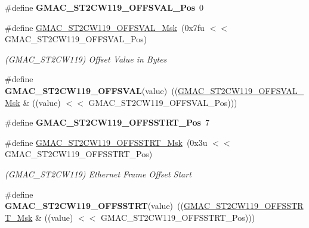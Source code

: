 \begin{DoxyCompactItemize}
\item 
\mbox{\label{group__SAME70__GMAC_ga085476f33b2de0d7a6acc78bb2274812}} 
\#define {\bfseries G\+M\+A\+C\+\_\+\+S\+T2\+C\+W119\+\_\+\+O\+F\+F\+S\+V\+A\+L\+\_\+\+Pos}~0
\item 
\mbox{\label{group__SAME70__GMAC_ga8acadd4c964c7e746cab7ab34153fdb1}} 
\#define \mbox{\hyperlink{group__SAME70__GMAC_ga8acadd4c964c7e746cab7ab34153fdb1}{G\+M\+A\+C\+\_\+\+S\+T2\+C\+W119\+\_\+\+O\+F\+F\+S\+V\+A\+L\+\_\+\+Msk}}~(0x7fu $<$$<$ G\+M\+A\+C\+\_\+\+S\+T2\+C\+W119\+\_\+\+O\+F\+F\+S\+V\+A\+L\+\_\+\+Pos)
\begin{DoxyCompactList}\small\item\em (G\+M\+A\+C\+\_\+\+S\+T2\+C\+W119) Offset Value in Bytes \end{DoxyCompactList}\item 
\mbox{\label{group__SAME70__GMAC_ga996e67c23d2b8f02918fde77c22cc99a}} 
\#define {\bfseries G\+M\+A\+C\+\_\+\+S\+T2\+C\+W119\+\_\+\+O\+F\+F\+S\+V\+AL}(value)~((\mbox{\hyperlink{group__SAMV71__GMAC_ga8acadd4c964c7e746cab7ab34153fdb1}{G\+M\+A\+C\+\_\+\+S\+T2\+C\+W119\+\_\+\+O\+F\+F\+S\+V\+A\+L\+\_\+\+Msk}} \& ((value) $<$$<$ G\+M\+A\+C\+\_\+\+S\+T2\+C\+W119\+\_\+\+O\+F\+F\+S\+V\+A\+L\+\_\+\+Pos)))
\item 
\mbox{\label{group__SAME70__GMAC_ga18ffa26520619e39aa339b9588abae56}} 
\#define {\bfseries G\+M\+A\+C\+\_\+\+S\+T2\+C\+W119\+\_\+\+O\+F\+F\+S\+S\+T\+R\+T\+\_\+\+Pos}~7
\item 
\mbox{\label{group__SAME70__GMAC_gac02934bd49150d33b2d4d4352d00d83a}} 
\#define \mbox{\hyperlink{group__SAME70__GMAC_gac02934bd49150d33b2d4d4352d00d83a}{G\+M\+A\+C\+\_\+\+S\+T2\+C\+W119\+\_\+\+O\+F\+F\+S\+S\+T\+R\+T\+\_\+\+Msk}}~(0x3u $<$$<$ G\+M\+A\+C\+\_\+\+S\+T2\+C\+W119\+\_\+\+O\+F\+F\+S\+S\+T\+R\+T\+\_\+\+Pos)
\begin{DoxyCompactList}\small\item\em (G\+M\+A\+C\+\_\+\+S\+T2\+C\+W119) Ethernet Frame Offset Start \end{DoxyCompactList}\item 
\mbox{\label{group__SAME70__GMAC_ga25a679e7f65e5db5b659158af1ae5acf}} 
\#define {\bfseries G\+M\+A\+C\+\_\+\+S\+T2\+C\+W119\+\_\+\+O\+F\+F\+S\+S\+T\+RT}(value)~((\mbox{\hyperlink{group__SAMV71__GMAC_gac02934bd49150d33b2d4d4352d00d83a}{G\+M\+A\+C\+\_\+\+S\+T2\+C\+W119\+\_\+\+O\+F\+F\+S\+S\+T\+R\+T\+\_\+\+Msk}} \& ((value) $<$$<$ G\+M\+A\+C\+\_\+\+S\+T2\+C\+W119\+\_\+\+O\+F\+F\+S\+S\+T\+R\+T\+\_\+\+Pos)))

\end{DoxyCompactItemize}
